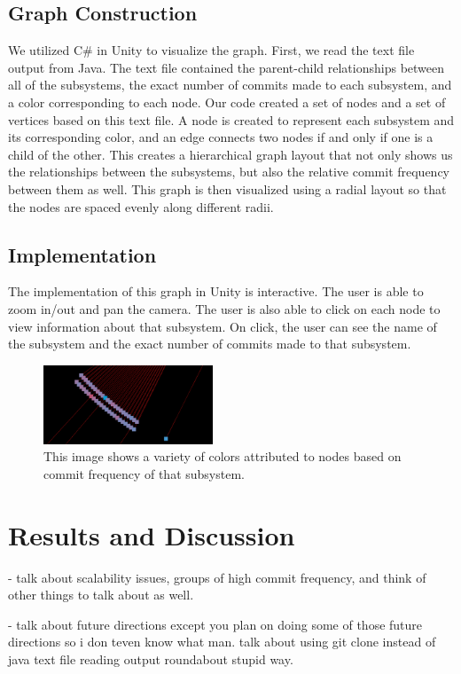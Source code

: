 \documentclass[conference]{IEEEtran}
\begin{document}
\subsection{Graph Construction}
We utilized C\# in Unity to visualize the graph. First, we read the text file output from Java. The text file contained the parent-child relationships between all of the subsystems, the exact number of commits made to each subsystem, and a color corresponding to each node. Our code created a set of nodes and a set of vertices based on this text file. A node is created to represent each subsystem and its corresponding color, and an edge connects two nodes if and only if one is a child of the other. This creates a hierarchical graph layout that not only shows us the relationships between the subsystems, but also the relative commit frequency between them as well. This graph is then visualized using a radial layout so that the nodes are spaced evenly along different radii.

\subsection{Implementation}
The implementation of this graph in Unity is interactive. The user is able to zoom in/out and pan the camera. The user is also able to click on each node to view information about that subsystem. On click, the user can see the name of the subsystem and the exact number of commits made to that subsystem. 

\begin{figure}[h!]
	\centering
	\includegraphics[width=0.45\textwidth]{randomSection.png}
	\caption{This image shows a variety of colors attributed to nodes based on commit frequency of that subsystem.}
\end{figure}

\section{Results and Discussion}

- talk about scalability issues, groups of high commit frequency, and think of other things to talk about as well.

- talk about future directions except you plan on doing some of those future directions so i don teven know what man. talk about using git clone instead of java text file reading output roundabout stupid way.
\end{document}
